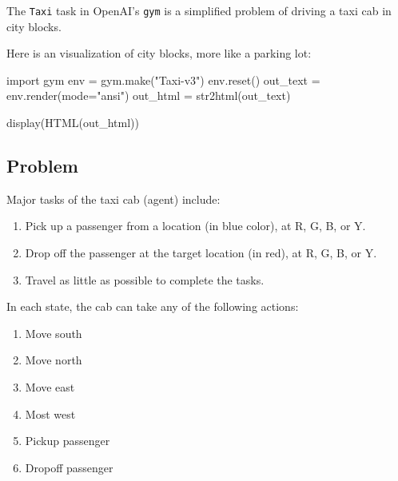 \documentclass[
  letterpaper,
]{scrbook}
\newenvironment{Shaded}{\begin{snugshade}}{\end{snugshade}}
\newcommand{\ImportTok}[1]{\textcolor[rgb]{0.00,0.46,0.62}{#1}}
\newcommand{\NormalTok}[1]{\textcolor[rgb]{0.00,0.23,0.31}{#1}}
\newcommand{\OperatorTok}[1]{\textcolor[rgb]{0.37,0.37,0.37}{#1}}
\newcommand{\StringTok}[1]{\textcolor[rgb]{0.13,0.47,0.30}{#1}}
\providecommand{\tightlist}{%
  \setlength{\itemsep}{0pt}\setlength{\parskip}{0pt}}
\begin{document}
The \texttt{Taxi} task in OpenAI's \texttt{gym} is a simplified problem
of driving a taxi cab in city blocks.

Here is an visualization of city blocks, more like a parking lot:

\begin{Shaded}
\begin{Highlighting}[]
\ImportTok{import}\NormalTok{ gym}
\NormalTok{env }\OperatorTok{=}\NormalTok{ gym.make(}\StringTok{"Taxi{-}v3"}\NormalTok{)}
\NormalTok{env.reset()}
\NormalTok{out\_text }\OperatorTok{=}\NormalTok{ env.render(mode}\OperatorTok{=}\StringTok{"ansi"}\NormalTok{)}
\NormalTok{out\_html }\OperatorTok{=}\NormalTok{ str2html(out\_text)}
\end{Highlighting}
\end{Shaded}

\begin{Shaded}
\begin{Highlighting}[]
\NormalTok{display(HTML(out\_html))}
\end{Highlighting}
\end{Shaded}

\subsection*{Problem}\label{problem}

Major tasks of the taxi cab (agent) include:

\begin{enumerate}
\def\labelenumi{\arabic{enumi}.}
\tightlist
\item
  Pick up a passenger from a location (in blue color), at R, G, B, or Y.
\item
  Drop off the passenger at the target location (in red), at R, G, B, or
  Y.
\item
  Travel as little as possible to complete the tasks.
\end{enumerate}

In each state, the cab can take any of the following actions:

\begin{enumerate}
\def\labelenumi{\arabic{enumi}.}
\setcounter{enumi}{-1}
\tightlist
\item
  Move south
\item
  Move north
\item
  Move east
\item
  Most west
\item
  Pickup passenger
\item
  Dropoff passenger
\end{enumerate}
\end{document}
